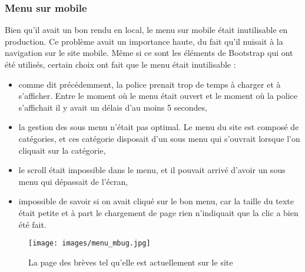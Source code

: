 \documentclass[12pt,a4paper]{article}
\begin{document}
\subsubsection{Menu sur mobile}
Bien qu'il avait un bon rendu en local, le menu sur mobile était inutilisable en production. Ce problème avait un importance haute, du fait qu'il nuisait à la navigation sur le site mobile. Même si ce sont les éléments de Bootstrap qui ont été utilisés, certain choix ont fait que le menu était inutilisable : 
\begin{itemize}
\item comme dit précédemment, la police prenait trop de temps à charger et à s'afficher. Entre le moment où le menu était ouvert et le moment où la police s'affichait il y avait un délais d'au moins 5 secondes,
\item la gestion des sous menu n'était pas optimal. Le menu du site est composé de catégories, et ces catégorie disposait d'un sous menu qui s'ouvrait lorsque l'on cliquait sur la catégorie,
\item le scroll était impossible dans le menu, et il pouvait arrivé d'avoir un sous menu qui dépassait de l'écran,
\item impossible de savoir si on avait cliqué sur le bon menu, car la taille du texte était petite et à part le chargement de page rien n'indiquait que la clic a bien été fait.
\end{itemize}\par 

\begin{figure}[h!]
\centering\texttt{[image: images/menu\_mbug.jpg]} 
\caption{La page des brèves tel qu'elle est actuellement sur le site}
\end{figure}
\end{document}
